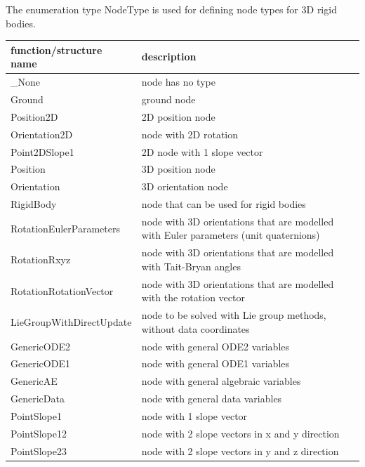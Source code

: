 \label{sec:NodeType}
The enumeration type  NodeType is used for defining node types for 3D rigid bodies.



\begin{center}
\footnotesize
\begin{longtable}{| p{8cm} | p{8cm} |} 
\hline
{\bf function/structure name} & {\bf description}\\ \hline
  \_None & node has no type\\ \hline  
  Ground & ground node\\ \hline  
  Position2D & 2D position node \\ \hline  
  Orientation2D & node with 2D rotation\\ \hline  
  Point2DSlope1 & 2D node with 1 slope vector\\ \hline  
  Position & 3D position node\\ \hline  
  Orientation & 3D orientation node\\ \hline  
  RigidBody & node that can be used for rigid bodies\\ \hline  
  RotationEulerParameters & node with 3D orientations that are modelled with Euler parameters (unit quaternions)\\ \hline  
  RotationRxyz & node with 3D orientations that are modelled with Tait-Bryan angles\\ \hline  
  RotationRotationVector & node with 3D orientations that are modelled with the rotation vector\\ \hline  
  LieGroupWithDirectUpdate & node to be solved with Lie group methods, without data coordinates\\ \hline  
  GenericODE2 & node with general ODE2 variables\\ \hline  
  GenericODE1 & node with general ODE1 variables\\ \hline  
  GenericAE & node with general algebraic variables\\ \hline  
  GenericData & node with general data variables\\ \hline  
  PointSlope1 & node with 1 slope vector\\ \hline  
  PointSlope12 & node with 2 slope vectors in x and y direction\\ \hline  
  PointSlope23 & node with 2 slope vectors in y and z direction\\ \hline  
\end{longtable}
\end{center}

